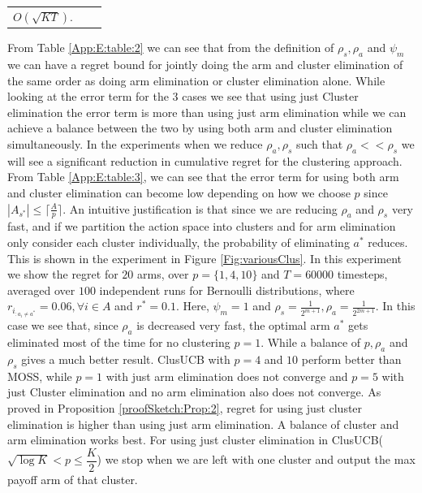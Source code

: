 \begin{remark}
\begin{table}
\begin{center}
\begin{tabular}{p{1.4cm}p{10.2cm}p{3.5cm}}
$O(\sqrt{KT})$.
\end{tabular}
\end{center}	
\end{table}
 From Table \ref{App:E:table:2} we can see that from the definition of $\rho_{s},\rho_{a}$ and $\psi_{m}$ we can have a regret bound for jointly doing the arm and cluster elimination of the same order as doing arm elimination or cluster elimination alone. While looking at the error term for the $3$ cases we see that using just Cluster elimination  the error term is more than using just arm elimination while we can achieve a balance between the two by using both arm and cluster elimination simultaneously. In the experiments when we reduce $\rho_{a}, \rho_{s}$ such that $\rho_{a}<<\rho_{s}$ we will see a significant reduction in cumulative regret for the clustering approach. From Table \ref{App:E:table:3}, we can see that the error term for using both arm and cluster elimination can become low depending on how we choose $p$ since $|A_{s^{*}}|\leq \lceil\frac{A}{p}\rceil$. An intuitive justification is that since we are reducing $\rho_{a}$ and $\rho_{s}$ very fast, and if we partition the action space into 
clusters and for arm elimination only consider each cluster individually, the probability of eliminating $a^{*}$ reduces. 
 This is shown in the experiment in Figure \ref{Fig:variousClus}. In this experiment we show the regret for $20$ arms, over $p=\lbrace 1,4,10\rbrace$ and $T=60000$ timesteps, averaged over $100$ independent runs for Bernoulli distributions, where $r_{i_{:{a_{i}\neq a^{*}}}}=0.06,\forall i\in A$ and $r^{*}=0.1$. Here, $\psi_{m}=1$ and $\rho_{s}=\frac{1}{2^{m+1}},\rho_{a}=\frac{1}{2^{2m+1}}$. In this case we see that, since $\rho_{a}$ is decreased very fast, the optimal arm $a^{*}$ gets eliminated most of the time for no clustering $p=1$. While a balance of $p,\rho_{a}$ and $\rho_{s}$ gives a much better result. ClusUCB with $p=4$ and $10$ perform better than MOSS, while $p=1$ with just arm elimination does not converge and $p=5$ with just Cluster elimination and no arm elimination also does not converge. As proved in Proposition \ref{proofSketch:Prop:2}, regret for using just cluster elimination is higher than using just arm elimination. A balance of cluster and arm elimination works best. For using just 
cluster elimination in ClusUCB($\sqrt{\log K}<p\leq \dfrac{K}{2}$) we stop when we are left with one cluster and output the max payoff arm of that cluster.


\end{remark}
